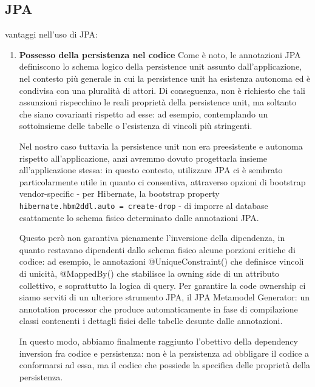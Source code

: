 \subsection{JPA}
vantaggi nell'uso di JPA:
\begin{enumerate}
    \item \textbf{Possesso della persistenza nel codice} \newline
          Come è noto, le annotazioni JPA definiscono lo schema logico della persistence unit
          assunto dall'applicazione, nel contesto più generale in cui la persistence unit ha
          esistenza autonoma ed è condivisa con una pluralità di attori.
          Di conseguenza, non è richiesto che tali assunzioni rispecchino le reali proprietà
          della persistence unit, ma soltanto che siano covarianti rispetto ad esse:
          ad esempio, contemplando un sottoinsieme delle tabelle o l'esistenza di vincoli più stringenti.

          Nel nostro caso tuttavia la persistence unit non era preesistente e autonoma
          rispetto all'applicazione, anzi avremmo dovuto progettarla insieme all'applicazione stessa:
          in questo contesto, utilizzare JPA ci è sembrato particolarmente utile in quanto ci consentiva,
          attraverso opzioni di bootstrap vendor-specific - per Hibernate, la bootstrap property
          \texttt{hibernate.hbm2ddl.auto = create-drop} - di imporre al database esattamente
          lo schema fisico determinato dalle annotazioni JPA.

          Questo però non garantiva pienamente l'inversione della dipendenza, in quanto
          restavano dipendenti dallo schema fisico alcune porzioni critiche di codice: ad esempio,
          le annotazioni @UniqueConstraint() che definisce vincoli di unicità, @MappedBy() che stabilisce
          la owning side di un attributo collettivo, e soprattutto la logica di query.
          Per garantire la code ownership ci siamo serviti di un ulteriore strumento JPA,
          il JPA Metamodel Generator: un annotation processor che produce automaticamente
          in fase di compilazione classi contenenti i dettagli fisici delle tabelle desunte
          dalle annotazioni.

          In questo modo, abbiamo finalmente raggiunto l'obettivo della dependency inversion
          fra codice e persistenza: non è la persistenza ad obbligare il codice a conformarsi
          ad essa, ma il codice che possiede la specifica delle proprietà della persistenza.


\end{enumerate}
